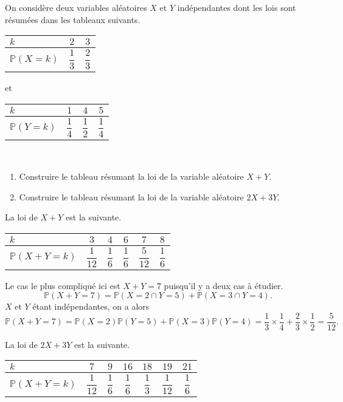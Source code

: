 \documentclass[11pt,fleqn, openany]{book} %
\begin{document}
\begin{exercise}[topic=lgn01]On considère deux variables aléatoires $X$ et $Y$ indépendantes dont les lois sont résumées dans les tableaux suivants.
\vskip10pt
\renewcommand{\arraystretch}{2.2}
\hfill
\begin{tabular}{|l|c|c|}
\hline
$k$ & $2$& $3$  \\
\hline
$\mathbb{P}(X=k)$ & $\dfrac{1}{3}$ & $\dfrac{2}{3}$ \\
\hline \end{tabular}
\hfill et \hfill
\begin{tabular}{|l|c|c|c|}
\hline
$k$ & $1$& $4$ & $5$ \\
\hline
$\mathbb{P}(Y=k)$ & $\dfrac{1}{4}$ & $\dfrac{1}{2}$ & $\dfrac{1}{4}$ \\
\hline \end{tabular}\hfill~
\vskip10pt
\begin{enumerate}
\item Construire le tableau résumant la loi de la variable aléatoire $X+Y$.
\item Construire le tableau résumant la loi de la variable aléatoire $2X+3Y$.
\end{enumerate}\end{exercise}

\begin{solution}La loi de $X+Y$ est la suivante.
\begin{center}
\renewcommand{\arraystretch}{2.2}
\begin{tabular}{|l|c|c|c|c|c|}
\hline
$k$ & $3$& $4$ & $6$ & $7$ & $8$  \\
\hline
$\mathbb{P}(X+Y=k)$ & $\dfrac{1}{12}$ & $\dfrac{1}{6}$ & $\dfrac{1}{6}$ & $\dfrac{5}{12}$ & $\dfrac{1}{6}$\\
\hline \end{tabular}\end{center}

Le cas le plus compliqué ici est $X+Y=7$ puisqu'il y a deux cas à étudier. 
\[\mathbb{P}(X+Y=7)=\mathbb{P}(X=2 \cap Y=5)+\mathbb{P}(X=3 \cap Y=4).\]
$X$ et $Y$ étant indépendantes, on a alors
\[\mathbb{P}(X+Y=7)=\mathbb{P}(X=2)\mathbb{P}(Y=5)+\mathbb{P}(X=3)\mathbb{P}( Y=4)=\dfrac{1}{3} \times \dfrac{1}{4}+ \dfrac{2}{3} \times \dfrac{1}{2}=\dfrac{5}{12}.\]

La loi de $2X+3Y$ est la suivante.

\begin{center}
\renewcommand{\arraystretch}{2.2}
\begin{tabular}{|l|c|c|c|c|c|c|}
\hline
$k$ & $7$& $9$ & $16$ & $18$ & $19$ & $21$  \\
\hline
$\mathbb{P}(X+Y=k)$ & $\dfrac{1}{12}$ & $\dfrac{1}{6}$ & $\dfrac{1}{6}$ & $\dfrac{1}{3}$ & $\dfrac{1}{12}$ & $\dfrac{1}{6}$\\
\hline \end{tabular}\end{center}\end{solution}
\end{document}
